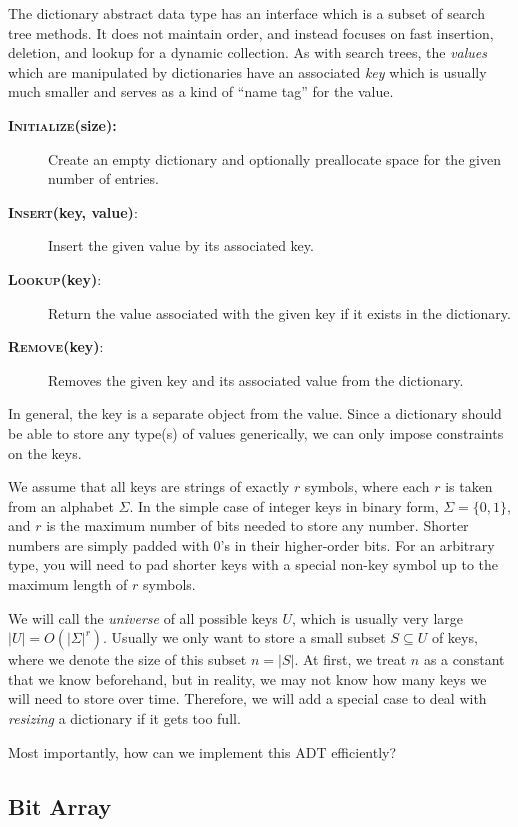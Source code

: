 \documentclass{article}[10pth]
\begin{document}
The dictionary abstract data type has an interface which is a subset of
search tree methods. It does not maintain order, and instead focuses on
fast insertion, deletion, and lookup for a dynamic collection.
As with search trees, the \textit{values}
which are manipulated by dictionaries have an associated \textit{key} which is
usually much smaller and serves as a kind of ``name tag'' for the value.

\begin{description}
\item[\textbf{\textsc{Initialize}(size):}]
Create an empty dictionary and optionally preallocate space for the given
number of entries.
\item[\textbf{\textsc{Insert}(key, value)}:]
Insert the given value by its associated key.
\item[\textbf{\textsc{Lookup}(key)}:]
Return the value associated with the given key if it exists in the
dictionary.
\item[\textbf{\textsc{Remove}(key)}:]
Removes the given key and its associated value from the dictionary.
\end{description}

In general, the key is a separate object from the value. Since a dictionary
should be able to store any type(s) of values generically, we can only
impose constraints on the keys.

We assume that all keys are strings of exactly $r$ symbols, where each
$r$ is taken from an alphabet $\Sigma$. In the simple case of integer
keys in binary form, $\Sigma = \{0,1\}$, and $r$ is the maximum number of
bits needed to store any number. Shorter numbers are simply padded with 0's
in their higher-order bits. For an arbitrary type,
you will need to pad shorter keys with a special
non-key symbol up to the maximum length of $r$ symbols.

We will call the \textit{universe} of all possible keys $U$, which is
usually very large $|U| = O(|\Sigma|^r)$. Usually we only want to store a
small subset $S \subseteq U$ of keys, where we denote the size of this
subset $n = |S|$. At first, we treat $n$ as a constant that we know beforehand,
but in reality, we may not know how many keys we will need to store over
time. Therefore, we will add a special case to deal with \textit{resizing}
a dictionary if it gets too full.

Most importantly, how can we implement this ADT efficiently?

\subsection{Bit Array}
\end{document}
